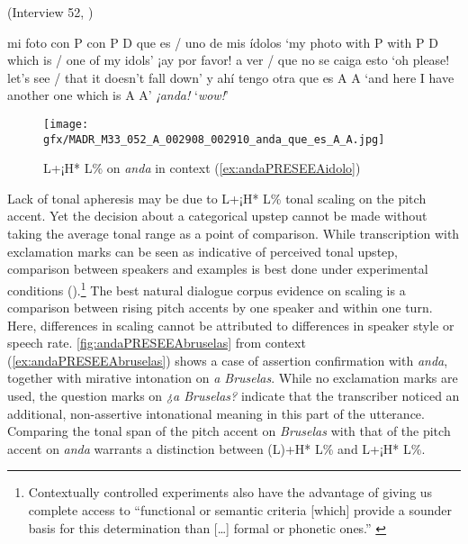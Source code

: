 \begin{exe}
	\ex (Interview 52, \cite{PRESEEA.20142020}) \label{ex:andaPRESEEAidolo}
	\begin{xlist}[A:]
	 mi foto con P con P D que es / uno de mis ídolos  
	\glt `my photo with P with P D which is / one of my idols'
	 ¡ay por favor! a ver / que no se caiga esto 
	\glt `oh please! let's see / that it doesn't fall down'
	 y ahí tengo otra que es A A  
	\glt `and here I have another one which is A A'
	  \textit{¡anda!}
	\glt `\textit{wow!}' 
	\end{xlist}
\end{exe}

\begin{figure}
	\texttt{[image: gfx/MADR\_M33\_052\_A\_002908\_002910\_anda\_que\_es\_A\_A.jpg]}
	\caption[L+¡H* L\% on \textit{anda} in context (\ref{ex:andaPRESEEAidolo})]{L+¡H* L\% on \textit{anda} in context (\ref{ex:andaPRESEEAidolo}) \href{https://osf.io/kqvn2/}{\faVolumeUp} \label{fig:andaPRESEEAidolo}}
\end{figure}

Lack of tonal apheresis may be due to L+¡H* L\% tonal scaling on the pitch accent. Yet the decision about a categorical upstep cannot be made without taking the average tonal range as a point of comparison. While transcription with exclamation marks can be seen as indicative of perceived tonal upstep, comparison between speakers and examples is best done under experimental conditions ().\footnote{Contextually controlled experiments also have the advantage of giving us complete access to ``functional or semantic criteria [which] provide a sounder basis for this determination than [\ldots] formal or phonetic ones.'' \citep[112]{Ladd.1980}} The best natural dialogue corpus evidence on scaling is a comparison between rising pitch accents by one speaker and within one turn. Here, differences in scaling cannot be attributed to differences in speaker style or speech rate. \autoref{fig:andaPRESEEAbruselas} from context (\ref{ex:andaPRESEEAbruselas}) shows a case of assertion confirmation with \textit{anda}, together with mirative intonation on \textit{a Bruselas}. While no exclamation marks are used, the question marks on \textit{¿a Bruselas?} indicate that the transcriber noticed an additional, non-assertive intonational meaning in this part of the utterance. Comparing the tonal span of the pitch accent on \textit{Bruselas} with that of the pitch accent on \textit{anda} warrants a distinction between (L)+H* L\% and L+¡H* L\%.


